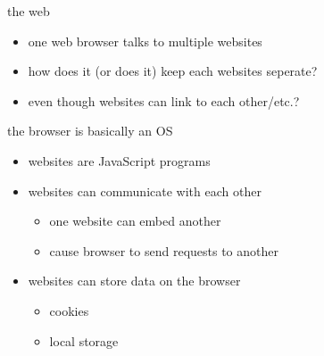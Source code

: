 
\begin{frame}{the web}
\begin{itemize}
    \item one web browser talks to multiple websites
    \item how does it (or does it) keep each websites seperate?
    \item even though websites can link to each other/etc.?
\end{itemize}
\end{frame}

\begin{frame}{the browser is basically an OS}
    \begin{itemize}
    \item websites are JavaScript programs
    \item websites can communicate with each other
        \begin{itemize}
        \item one website can embed another
        \item cause browser to send requests to another
        \end{itemize}
    \item websites can store data on the browser
        \begin{itemize}
        \item cookies
        \item local storage
        \end{itemize}
    \end{itemize}
\end{frame}


